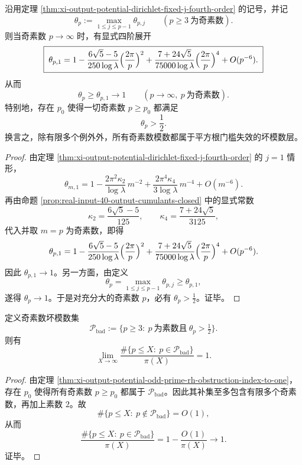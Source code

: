 \begin{theorem}\label{thm:xi-output-potential-odd-prime-rh-obstruction-index-to-one}
沿用定理 \ref{thm:xi-output-potential-dirichlet-fixed-j-fourth-order} 的记号，并记
\[
\theta_p:=\max_{1\le j\le p-1}\theta_{p,j}
\qquad(p\ge 3\ \text{为奇素数}).
\]
则当奇素数 \(p\to\infty\) 时，有显式四阶展开
\[
\boxed{\;
\theta_{p,1}
=
1-\frac{6\sqrt5-5}{250\log\lambda}\Bigl(\frac{2\pi}{p}\Bigr)^2
+\frac{7+24\sqrt5}{75000\log\lambda}\Bigl(\frac{2\pi}{p}\Bigr)^4
+O(p^{-6}).\;}
\]
从而
\[
\boxed{\;
\theta_p\ge \theta_{p,1}\longrightarrow 1
\qquad(p\to\infty,\ p\ \text{为奇素数}).\;}
\]
特别地，存在 \(p_0\) 使得一切奇素数 \(p\ge p_0\) 都满足
\[
\theta_p>\frac12.
\]
换言之，除有限多个例外外，所有奇素数模数都属于平方根门槛失效的坏模数层。
\end{theorem}
\begin{proof}
由定理 \ref{thm:xi-output-potential-dirichlet-fixed-j-fourth-order} 的 \(j=1\) 情形，
\[
\theta_{m,1}
=
1-\frac{2\pi^2\kappa_2}{\log\lambda}\,m^{-2}
+\frac{2\pi^4\kappa_4}{3\log\lambda}\,m^{-4}
+O(m^{-6}).
\]
再由命题 \ref{prop:real-input-40-output-cumulants-closed} 中的显式常数
\[
\kappa_2=\frac{6\sqrt5-5}{125},
\qquad
\kappa_4=\frac{7+24\sqrt5}{3125},
\]
代入并取 \(m=p\) 为奇素数，即得
\[
\theta_{p,1}
=
1-\frac{6\sqrt5-5}{250\log\lambda}\Bigl(\frac{2\pi}{p}\Bigr)^2
+\frac{7+24\sqrt5}{75000\log\lambda}\Bigl(\frac{2\pi}{p}\Bigr)^4
+O(p^{-6}).
\]
因此 \(\theta_{p,1}\to 1\)。另一方面，由定义
\[
\theta_p=\max_{1\le j\le p-1}\theta_{p,j}\ge \theta_{p,1},
\]
遂得 \(\theta_p\to 1\)。于是对充分大的奇素数 \(p\)，必有 \(\theta_p>\tfrac12\)。证毕。
\end{proof}

\begin{corollary}\label{cor:xi-output-potential-odd-prime-bad-moduli-prime-density-one}
定义奇素数坏模数集
\[
\mathcal P_{\mathrm{bad}}
:=
\{p\ge 3:\ p\ \text{为素数且}\ \theta_p>\tfrac12\}.
\]
则有
\[
\boxed{\;
\lim_{X\to\infty}
\frac{\#\{p\le X:\ p\in\mathcal P_{\mathrm{bad}}\}}{\pi(X)}
=1.\;}
\]
\end{corollary}
\begin{proof}
由定理 \ref{thm:xi-output-potential-odd-prime-rh-obstruction-index-to-one}，存在 \(p_0\) 使得所有奇素数 \(p\ge p_0\) 都属于 \(\mathcal P_{\mathrm{bad}}\)。因此其补集至多包含有限多个奇素数，再加上素数 \(2\)。故
\[
\#\{p\le X:\ p\notin\mathcal P_{\mathrm{bad}}\}=O(1),
\]
从而
\[
\frac{\#\{p\le X:\ p\in\mathcal P_{\mathrm{bad}}\}}{\pi(X)}
=
1-\frac{O(1)}{\pi(X)}
\longrightarrow 1.
\]
证毕。
\end{proof}

\endinput

